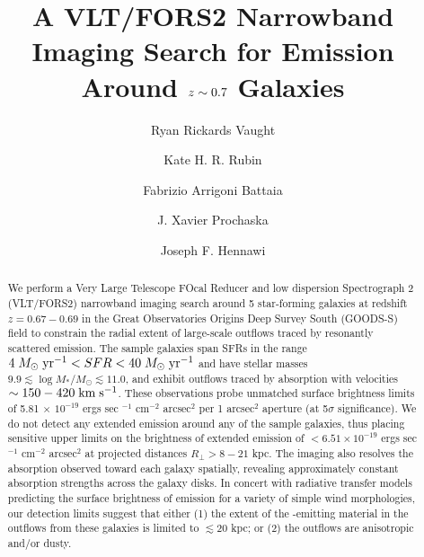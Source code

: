 \documentclass[twocolumn]{aastex61}
\def \mkms {{\rm \; km\;s^{-1}}}
\def \msunperyr {{\; M_{\odot}\rm \;yr^{-1}}}
\begin{document}
\title{A VLT/FORS2 Narrowband Imaging Search for  Emission Around $\lowercase{z}\sim0.7$ Galaxies }
\author{Ryan Rickards Vaught}
 
 \author{Kate H. R. Rubin }
 
 \author{Fabrizio Arrigoni Battaia }

 \author{J. Xavier Prochaska}
 
\author{Joseph F. Hennawi}


\begin{abstract}
We perform a Very Large Telescope FOcal Reducer and low dispersion Spectrograph 2 (VLT/FORS2) narrowband imaging search around 5 star-forming galaxies at redshift $z=0.67-0.69$ in the Great Observatories Origins Deep Survey South (GOODS-S) field to constrain the radial extent of large-scale outflows traced by resonantly scattered  emission. The sample galaxies span SFRs in the range $4\msunperyr< SFR < 40\msunperyr$ and have stellar masses $9.9 \lesssim \log M_{*}/M_{\odot} \lesssim 11.0$, and exhibit outflows traced by  absorption with velocities $\sim150-420\mkms$.
These observations probe unmatched surface brightness limits of 5.81 $\times$ $10^{-19}$ ergs sec $^{-1}$ cm$^{-2}$ arcsec$^2$ per 1 arcsec$^2$ aperture (at 5$\sigma$ significance).  We do not detect any extended emission around any of the sample galaxies, thus placing sensitive upper limits on the brightness of extended  emission of $<6.51 \times 10^{-19}$ ergs sec $^{-1}$ cm$^{-2}$ arcsec$^2$ at projected distances $R_{\perp} > 8-21$ kpc. The imaging also resolves the  absorption observed toward each galaxy spatially, revealing approximately constant absorption strengths across the galaxy disks. 
In concert with radiative transfer models predicting the surface brightness of  emission for a variety of simple wind morphologies, our detection limits suggest that either (1) the extent of the -emitting material in the outflows from these galaxies is limited to $\lesssim 20$ kpc; or (2) the outflows are anisotropic and/or dusty.  
\end{abstract}
\end{document}
